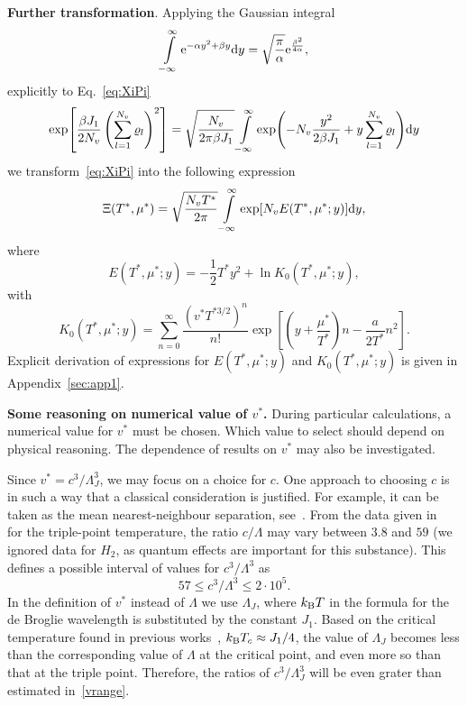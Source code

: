 \documentclass[12pt]{article}
\numberwithin{equation}{section}
\begin{document}
	\textbf{Further transformation}. Applying the Gaussian integral
	\begin{equation}
		\int\limits_{-\infty}^{\infty} {\rm e}^{-\alpha y^2 + \beta y} {\rm d}y = \sqrt{\frac{\pi}{\alpha}} {\rm e}^{\frac{\beta^2}{4\alpha}},
	\end{equation}
	explicitly to Eq.~\eqref{eq:XiPi}
	\begin{equation}
		\label{eq:gaussInt}
		\exp[\frac{\beta J_1}{2N_v}\left(\sum_{l=1}^{N_v} \varrho_l\right)^2] = \sqrt{\frac{N_v}{2\pi \beta J_1}}
		\int\limits_{-\infty}^{\infty} \exp(-N_v \frac{y^2}{2\beta J_1} + y\sum_{l=1}^{N_v} \varrho_l) {\rm d}y
	\end{equation}
	we transform~\eqref{eq:XiPi} into the following expression
	\begin{equation}
		\label{eq:XiInty}
		\Xi (T^*, \mu^*) = \sqrt{\frac{N_v T^*}{2\pi}} \int\limits_{-\infty}^{\infty} \exp[N_v E(T^*, \mu^*; y)] {\rm d} y,
	\end{equation}
	where 
	\begin{equation}
		\label{def:E}
		E(T^*,\mu^*; y) = -\frac12T^*y^2 + \ln K_0(T^*,\mu^*; y),
	\end{equation}
	with
	\begin{equation}
		\label{def:K}
		K_0(T^*,\mu^*; y) = \sum_{n=0}^{\infty} \frac{\left(v^* T^{*3/2}\right)^n}{n!} \exp[\left(y+\frac{\mu^*}{T^*}\right)n - \frac{a}{2T^*}n^2].
	\end{equation}
	Explicit derivation of expressions for $E(T^*,\mu^*;y)$ and $K_0(T^*,\mu^*;y)$ is given in Appendix~\ref{sec:app1}.
	
	\textbf{Some reasoning on numerical value of $v^*$.} During particular calculations, a numerical value for $v^*$ must be chosen. Which value to select should depend on physical reasoning. The dependence of results on $v^*$ may also be investigated.
	
	Since $v^* = c^3/\Lambda_J^3$, we may focus on a choice for $c$. One approach to choosing $c$ is in such a way that a classical consideration is justified. For example, it can be taken as the mean nearest-neighbour separation, see~\cite[Sec.~1.1]{HansenMcDonald13}. From the data given in~\cite[Table~1.1]{HansenMcDonald13} for the triple-point temperature, the ratio $c/\Lambda$ may vary between $3.8$ and $59$ (we ignored data for $H_2$, as quantum effects are important for this substance). This defines a possible interval of values for $c^3/\Lambda^3$ as
	\begin{equation}
		\label{vrange}
		57 \leq c^3/\Lambda^3 \leq 2 \cdot 10^5.
	\end{equation}
	In the definition of $v^*$ instead of $\Lambda$ we use $\Lambda_J$, where $k_{\rm B} T$ in the formula for the de Broglie wavelength is substituted by the constant $J_1$. Based on the critical temperature found in previous works~\cite{KKD18, KKD20, KD22}, $k_{\rm B}T_c \approx J_1/4$, the value of $\Lambda_J$ becomes less than the corresponding value of $\Lambda$ at the critical point, and even more so than that at the triple point. Therefore, the ratios of $c^3/\Lambda_J^3$ will be even grater than estimated in~\eqref{vrange}. 
	
\end{document}
